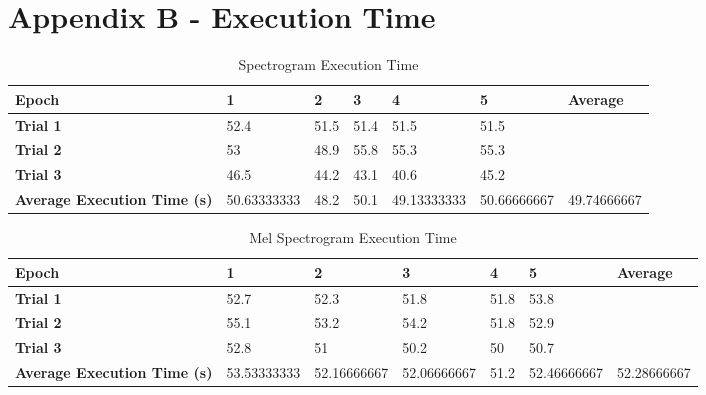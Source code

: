 
\chapter{Appendix B - Execution Time} %

\label{AppendixB} %

\begin{table}[!ht]
    \centering
    \caption{Spectrogram Execution Time}
    \begin{adjustbox}{width=\textwidth,keepaspectratio}
    \begin{tabular}{|l|l|l|l|l|l|l|}
    \hline
        \textbf{Epoch} & \textbf{1} & \textbf{2} & \textbf{3} & \textbf{4} & \textbf{5} & \textbf{Average} \\ \hline
        \textbf{Trial 1} & 52.4 & 51.5 & 51.4 & 51.5 & 51.5 & ~ \\ \hline
        \textbf{Trial 2} & 53 & 48.9 & 55.8 & 55.3 & 55.3 & ~ \\ \hline
        \textbf{Trial 3} & 46.5 & 44.2 & 43.1 & 40.6 & 45.2 & ~ \\ \hline
        \textbf{Average Execution Time (s)} & 50.63333333 & 48.2 & 50.1 & 49.13333333 & 50.66666667 & 49.74666667 \\ \hline
    \end{tabular}
    \end{adjustbox}
    \label{spectro_time}
\end{table}

\begin{table}[!ht]
    \centering
    \caption{Mel Spectrogram Execution Time}
    \begin{adjustbox}{width=\textwidth,keepaspectratio}
    \begin{tabular}{|l|l|l|l|l|l|l|}
    \hline
        \textbf{Epoch} & \textbf{1} & \textbf{2} & \textbf{3} & \textbf{4} & \textbf{5} & \textbf{Average} \\ \hline
        \textbf{Trial 1} & 52.7 & 52.3 & 51.8 & 51.8 & 53.8 & ~ \\ \hline
        \textbf{Trial 2} & 55.1 & 53.2 & 54.2 & 51.8 & 52.9 & ~ \\ \hline
        \textbf{Trial 3} & 52.8 & 51 & 50.2 & 50 & 50.7 & ~ \\ \hline
        \textbf{Average Execution Time (s)} & 53.53333333 & 52.16666667 & 52.06666667 & 51.2 & 52.46666667 & 52.28666667 \\ \hline
    \end{tabular}
    \end{adjustbox}
    \label{melspectro_time}
\end{table}

